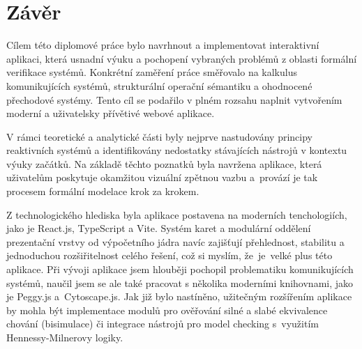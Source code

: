 \chapter{Závěr}

Cílem této diplomové práce bylo navrhnout a implementovat interaktivní aplikaci, která usnadní výuku a pochopení vybraných problémů z oblasti formální verifikace systémů. 
Konkrétní zaměření práce směřovalo na kalkulus komunikujících systémů, strukturální operační sémantiku a ohodnocené přechodové systémy. 
Tento cíl se podařilo v plném rozsahu naplnit vytvořením moderní a uživatelsky přívětivé webové aplikace.

V rámci teoretické a analytické části byly nejprve nastudovány principy reaktivních systémů a identifikovány nedostatky stávajících nástrojů v kontextu výuky začátků. 
Na základě těchto poznatků byla navržena aplikace, která uživatelům poskytuje okamžitou vizuální zpětnou vazbu a~provází je tak procesem formální modelace krok za krokem. 

Z technologického hlediska byla aplikace postavena na moderních tenchologiích, jako je React.js, TypeScript a Vite. 
Systém karet a modulární oddělení prezentační vrstvy od výpočetního jádra navíc zajišťují přehlednost, stabilitu a jednoduchou rozšiřitelnost celého řešení, což si myslím, že~je~velké plus této aplikace. 
Při vývoji aplikace jsem hlouběji pochopil problematiku komunikujících systémů, naučil jsem se ale také pracovat s několika moderními knihovnami, jako je Peggy.js a~Cytoscape.js. 
Jak již bylo nastíněno, užitečným rozšířením aplikace by mohla být implementace modulů pro ověřování silné a slabé ekvivalence chování (bisimulace) či integrace nástrojů pro model checking s~využitím Hennessy-Milnerovy logiky.


\endinput